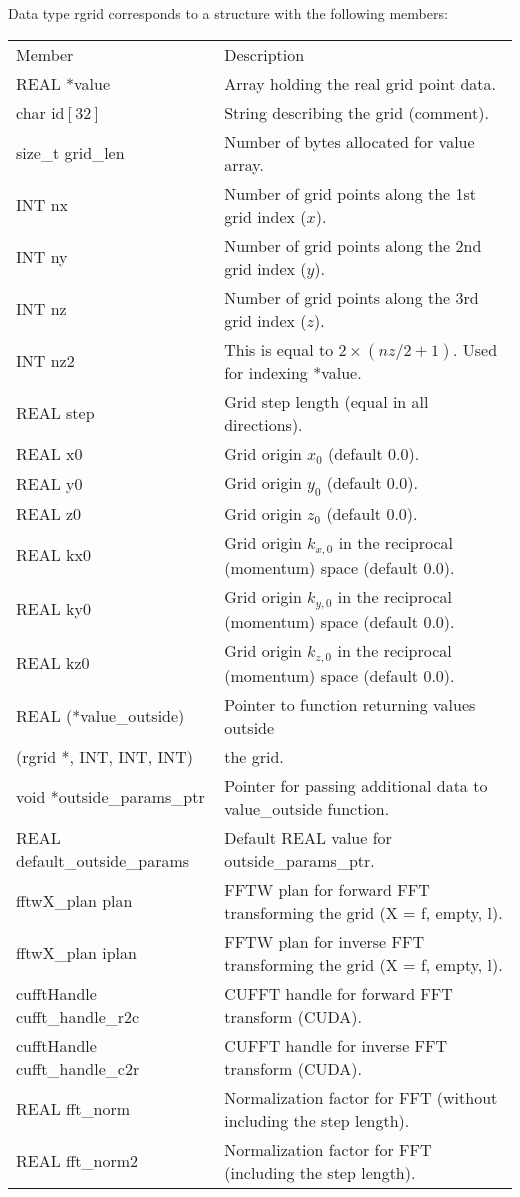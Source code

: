 \documentclass[12pt,letterpaper]{article}
\begin{document}
Data type rgrid corresponds to a structure with the following members:
\begin{longtable}{p{} p{}}
Member & Description\\
\cline{1-2}
REAL *value & Array holding the real grid point data.\\
char id$[32]$ & String describing the grid (comment).\\
size\_t grid\_len & Number of bytes allocated for value array.\\
INT nx & Number of grid points along the 1st grid index ($x$).\\
INT ny & Number of grid points along the 2nd grid index ($y$).\\
INT nz & Number of grid points along the 3rd grid index ($z$).\\
INT nz2 & This is equal to $2\times(nz / 2 + 1)$. Used for indexing *value.\\
REAL step & Grid step length (equal in all directions).\\
REAL x0 & Grid origin $x_0$ (default 0.0).\\
REAL y0 & Grid origin $y_0$ (default 0.0).\\
REAL z0 & Grid origin $z_0$ (default 0.0).\\
REAL kx0 & Grid origin $k_{x,0}$ in the reciprocal (momentum) space (default 0.0).\\
REAL ky0 & Grid origin $k_{y,0}$ in the reciprocal (momentum) space (default 0.0).\\
REAL kz0 & Grid origin $k_{z,0}$ in the reciprocal (momentum) space (default 0.0).\\
REAL (*value\_outside) & Pointer to function returning values outside\\
\phantom{X}(rgrid *, INT, INT, INT) & the grid.\\
void *outside\_params\_ptr & Pointer for passing additional data to value\_outside function.\\
REAL default\_outside\_params & Default REAL value for outside\_params\_ptr.\\
fftwX\_plan plan & FFTW plan for forward FFT transforming the grid (X = f, empty, l).\\
fftwX\_plan iplan & FFTW plan for inverse FFT transforming the grid (X = f, empty, l).\\
cufftHandle cufft\_handle\_r2c & CUFFT handle for forward FFT transform (CUDA).\\
cufftHandle cufft\_handle\_c2r & CUFFT handle for inverse FFT transform (CUDA).\\
REAL fft\_norm & Normalization factor for FFT (without including the step length).\\
REAL fft\_norm2 & Normalization factor for FFT (including the step length).\\
\end{longtable}
\end{document}
